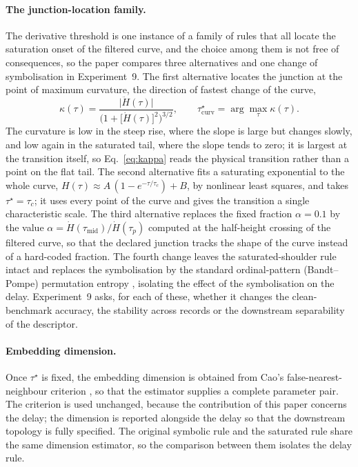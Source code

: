 \documentclass[10pt,a4paper,twocolumn]{article}
\begin{document}
\paragraph{The junction-location family.}
The derivative threshold is one instance of a family of rules that all locate
the saturation onset of the filtered curve, and the choice among them is not
free of consequences, so the paper compares three alternatives and one change
of symbolisation in Experiment~9.  The first alternative locates the junction
at the point of maximum curvature, the direction of fastest change of the
curve,
\begin{equation}
\kappa(\tau) = \frac{\lvert \ddot{H}(\tau) \rvert}
{\bigl(1 + \bigl[\dot{H}(\tau)\bigr]^2\bigr)^{3/2}},
\qquad
\tau^{\star}_{\mathrm{curv}} = \arg\max_{\tau} \kappa(\tau) .
\label{eq:kappa}
\end{equation}
The curvature is low in the steep rise, where the slope is large but changes
slowly, and low again in the saturated tail, where the slope tends to zero; it
is largest at the transition itself, so Eq.~\eqref{eq:kappa} reads the
physical transition rather than a point on the flat tail.  The second
alternative fits a saturating exponential to the whole curve,
$H(\tau) \approx A\,(1 - e^{-\tau/\tau_c}) + B$, by nonlinear least squares,
and takes $\tau^{\star} = \tau_c$; it uses every point of the curve and gives
the transition a single characteristic scale.  The third alternative replaces
the fixed fraction $\alpha = 0.1$ by the value
$\alpha = \dot{H}(\tau_{\mathrm{mid}})/\dot{H}(\tau_p)$ computed at the
half-height crossing of the filtered curve, so that the declared junction
tracks the shape of the curve instead of a hard-coded fraction.  The fourth
change leaves the saturated-shoulder rule intact and replaces the symbolisation
by the standard ordinal-pattern (Bandt--Pompe) permutation entropy
\citep{bandt2002}, isolating the effect of the symbolisation on the delay.
Experiment~9 asks, for each of these, whether it changes the clean-benchmark
accuracy, the stability across records or the downstream separability of the
descriptor.

\paragraph{Embedding dimension.}
Once $\tau^{\star}$ is fixed, the embedding dimension is obtained from Cao's
false-nearest-neighbour criterion \citep{cao1997}, so that the estimator
supplies a complete parameter pair.  The criterion is used unchanged, because
the contribution of this paper concerns the delay; the dimension is reported
alongside the delay so that the downstream topology is fully specified.  The
original symbolic rule and the saturated rule share the same dimension
estimator, so the comparison between them isolates the delay rule.
\end{document}

